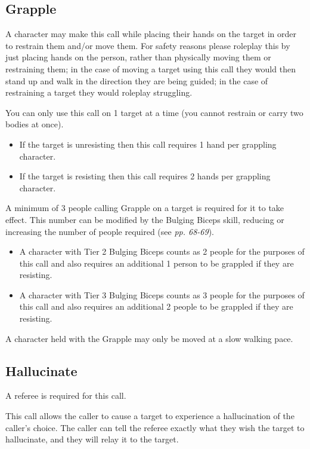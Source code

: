 \documentclass{scrbook}
\begin{document}
\subsection{Grapple}

A character may make this call while placing their hands on the target in order to restrain them and/or move them. For safety reasons please roleplay this by just placing hands on the person, rather than physically moving them or restraining them; in the case of moving a target using this call they would then stand up and walk in the direction they are being guided; in the case of restraining a target they would roleplay struggling.

You can only use this call on 1 target at a time (you cannot restrain or carry two bodies at once).

\begin{itemize}
\item If the target is unresisting then this call requires 1 hand per grappling character.

\item If the target is resisting then this call requires 2 hands per grappling character.

\end{itemize}
A minimum of 3 people calling Grapple on a target is required for it to take effect. This number can be modified by the Bulging Biceps skill, reducing or increasing the number of people required (see \textit{pp. 68-69}).

\begin{itemize}
\item A character with Tier 2 Bulging Biceps counts as 2 people for the purposes of this call and also requires an additional 1 person to be grappled if they are resisting.

\item A character with Tier 3 Bulging Biceps counts as 3 people for the purposes of this call and also requires an additional 2 people to be grappled if they are resisting.

\end{itemize}
A character held with the Grapple may only be moved at a slow walking pace.

\subsection{Hallucinate}

A referee is required for this call.

This call allows the caller to cause a target to experience a hallucination of the caller's choice. The caller can tell the referee exactly what they wish the target to hallucinate, and they will relay it to the target.
\end{document}

